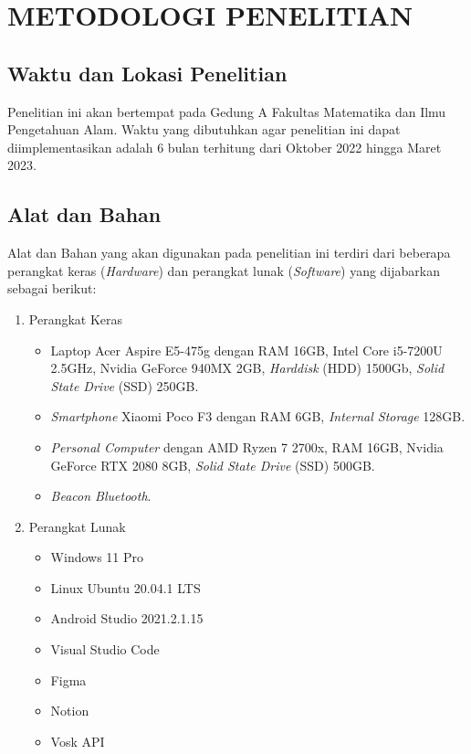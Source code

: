 \fancyhf{} 
\fancyfoot[C]{\thepage}
\chapter{METODOLOGI PENELITIAN}

\section{Waktu dan Lokasi Penelitian}
Penelitian ini akan bertempat pada Gedung A Fakultas Matematika dan Ilmu Pengetahuan Alam. Waktu yang dibutuhkan agar penelitian ini dapat diimplementasikan adalah 6 bulan terhitung dari Oktober 2022 hingga Maret 2023.

\section{Alat dan Bahan}
Alat dan Bahan yang akan digunakan pada penelitian ini terdiri dari beberapa perangkat keras (\textit{Hardware}) dan perangkat lunak (\textit{Software}) yang dijabarkan sebagai berikut:

\begin{enumerate}
\item Perangkat Keras
	\begin{itemize}
	\item Laptop Acer Aspire E5-475g dengan RAM 16GB, Intel Core i5-7200U 2.5GHz, Nvidia GeForce 940MX 2GB, \textit{Harddisk} (HDD) 1500Gb, \textit{Solid State Drive} (SSD) 250GB.
	\item \textit{Smartphone} Xiaomi Poco F3 dengan RAM 6GB, \textit{Internal Storage} 128GB.
	\item \textit{Personal Computer} dengan AMD Ryzen 7 2700x, RAM 16GB, Nvidia GeForce RTX 2080 8GB, \textit{Solid State Drive} (SSD) 500GB.
	\item \textit{Beacon Bluetooth}.
	\end{itemize}

\item Perangkat Lunak
	\begin{itemize}
	\item Windows 11 Pro
	\item Linux Ubuntu 20.04.1 LTS
	\item Android Studio 2021.2.1.15
	\item Visual Studio Code
	\item Figma
	\item Notion
	\item Vosk API
	
	\end{itemize}
\end{enumerate}


